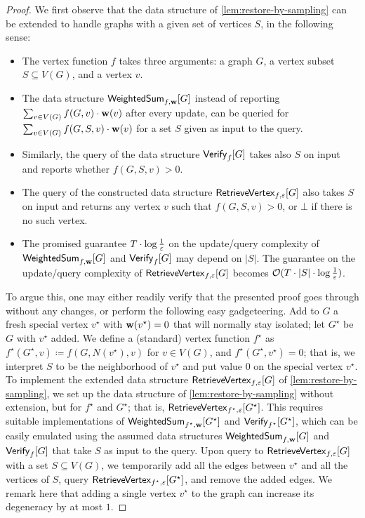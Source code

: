 \begin{proof}
	
	
	We first observe that the data structure of \cref{lem:restore-by-sampling} can be extended to handle graphs with a given set of vertices $S$, in the following sense:
	\begin{itemize}
		\item The vertex function $f$ takes three arguments: a graph $G$, a vertex subset $S\subseteq V(G)$, and a vertex $v$.
		\item The data structure $\mathsf{WeightedSum}_{f, \mathbf{w}}[G]$ instead of reporting $\sum_{v\in V(G)}f(G,v)\cdot \mathbf{w}(v)$ after every update, can be queried for $\sum_{v\in V(G)}f(G,S,v)\cdot \mathbf{w}(v)$ for a set $S$ given as input to the query.
		\item Similarly, the query of the data structure $\mathsf{Verify}_{f}[G]$ takes also $S$ on input and reports whether $f(G,S,v)>0$.
		\item The query of the constructed data structure $\mathsf{RetrieveVertex}_{f,\varepsilon}[G]$ also takes  $S$ on input and returns any vertex $v$ such that $f(G,S,v)>0$, or $\bot$ if there is no such vertex.
		\item The promised guarantee $T\cdot \log \tfrac{1}{\varepsilon}$ on the update/query complexity of $\mathsf{WeightedSum}_{f, \mathbf{w}}[G]$ and $\mathsf{Verify}_{f}[G]$ may depend on $|S|$. The guarantee on the update/query complexity of $\mathsf{RetrieveVertex}_{f,\varepsilon}[G]$ becomes $\mathcal{O}(T\cdot |S|\cdot \log \tfrac{1}{\varepsilon})$.
	\end{itemize}
	To argue this, one may either readily verify that the presented proof goes through without any changes, or perform the following easy gadgeteering.
	Add to $G$ a fresh special vertex $v^\star$ with $\mathbf{w}(v^\star)=0$ that will normally stay isolated; let $G^\star$ be $G$ with $v^\star$ added.
	We define a (standard) vertex function $f^\star$ as $f^\star(G^\star,v)\coloneqq f(G,N(v^\star),v)$ for $v\in V(G)$, and $f^\star(G^\star,v^\star)=0$; that is, we interpret $S$ to be the neighborhood of $v^\star$ and put value $0$ on the special vertex $v^\star$. To implement the extended data structure $\mathsf{RetrieveVertex}_{f,\varepsilon}[G]$ of \cref{lem:restore-by-sampling}, we set up the data structure of \cref{lem:restore-by-sampling} without extension, but for $f^\star$ and $G^\star$; that is, $\mathsf{RetrieveVertex}_{f^\star,\varepsilon}[G^\star]$. This requires suitable implementations of $\mathsf{WeightedSum}_{f^\star, \mathbf{w}}[G^\star]$ and $\mathsf{Verify}_{f^\star}[G^\star]$, which can be easily emulated using the assumed data structures $\mathsf{WeightedSum}_{f, \mathbf{w}}[G]$ and $\mathsf{Verify}_f[G]$ that take $S$ as input to the query. 
	Upon query to $\mathsf{RetrieveVertex}_{f,\varepsilon}[G]$ with a set $S\subseteq V(G)$, we temporarily add all the edges between $v^\star$ and all the vertices of $S$, query $\mathsf{RetrieveVertex}_{f^\star,\varepsilon}[G^\star]$, and remove the added edges. We remark here that adding a single vertex $v^\star$ to the graph can increase its degeneracy by at most $1$.


\end{proof}
